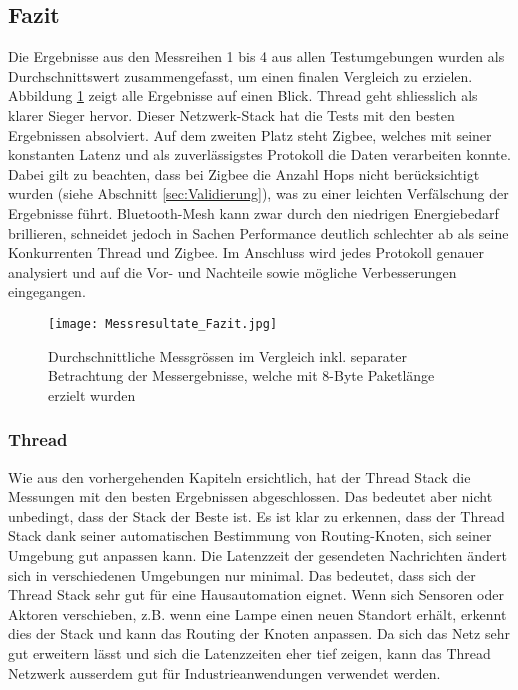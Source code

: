 \subsection{Fazit}\label{subsec:FazitVergleich}
Die Ergebnisse aus den Messreihen 1 bis 4 aus allen Testumgebungen wurden als Durchschnittswert zusammengefasst, um einen finalen Vergleich zu erzielen. Abbildung \ref{fig:Messresultate_Fazit} zeigt alle Ergebnisse auf einen Blick. Thread geht shliesslich als klarer Sieger hervor. Dieser Netzwerk-Stack hat die Tests mit den besten Ergebnissen absolviert. Auf dem zweiten Platz steht Zigbee, welches mit seiner konstanten Latenz und als zuverlässigstes Protokoll die Daten verarbeiten konnte. Dabei gilt zu beachten, dass bei Zigbee die Anzahl Hops nicht berücksichtigt wurden (siehe Abschnitt \ref{sec:Validierung}), was zu einer leichten Verfälschung der Ergebnisse führt. Bluetooth-Mesh kann zwar durch den niedrigen Energiebedarf brillieren, schneidet jedoch in Sachen Performance deutlich schlechter ab als seine Konkurrenten Thread und Zigbee. Im Anschluss wird jedes Protokoll genauer analysiert und auf die Vor- und Nachteile sowie mögliche Verbesserungen eingegangen. 

\begin{figure}[H]
	\centering
	\texttt{[image: Messresultate\_Fazit.jpg]}
	\caption{Durchschnittliche Messgrössen im Vergleich inkl. separater Betrachtung der Messergebnisse, welche mit 8-Byte Paketlänge erzielt wurden}\label{fig:Messresultate_Fazit}
\end{figure}

\subsubsection{Thread}\label{subsubsec:FazitThread}
Wie aus den vorhergehenden Kapiteln ersichtlich, hat der Thread Stack die Messungen mit den besten Ergebnissen abgeschlossen.
Das bedeutet aber nicht unbedingt, dass der Stack der Beste ist.
Es ist klar zu erkennen, dass der Thread Stack dank seiner automatischen Bestimmung von Routing-Knoten, sich seiner Umgebung gut anpassen kann.
Die Latenzzeit der gesendeten Nachrichten ändert sich in verschiedenen Umgebungen nur minimal.
Das bedeutet, dass sich der Thread Stack sehr gut für eine Hausautomation eignet.
Wenn sich Sensoren oder Aktoren verschieben, z.B. wenn eine Lampe einen neuen Standort erhält, erkennt dies der Stack und kann das Routing der Knoten anpassen.
Da sich das Netz sehr gut erweitern lässt und sich die Latenzzeiten eher tief zeigen, kann das Thread Netzwerk ausserdem gut für Industrieanwendungen verwendet werden. 


